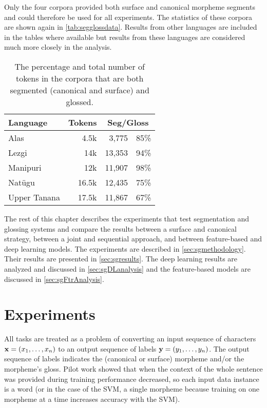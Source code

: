 Only the four corpora provided both surface and canonical morpheme segments and could therefore be used for all experiments. The statistics of these corpora are shown again in \autoref{tab:segglossdata}. Results from other languages are included in the tables where available but results from these languages are considered much more closely in the analysis. 

\begin{table}[!tb]
    \centering
    \begin{tabular}{l|r|rc}
         \textbf{Language} & \textbf{Tokens} & \multicolumn{2}{c}{\textbf{Seg/Gloss}} \\
         \hline
         Alas & 4.5k & 3,775 & 85\%  \\
         \hline
         Lezgi & 14k & 13,353  & 94\% \\
         \hline
         Manipuri & 12k & 11,907 & 98\% \\
         \hline
         Natügu & 16.5k & 12,435 & 75\%  \\
         \hline
         Upper Tanana & 17.5k & 11,867 & 67\% 
    \end{tabular}
    \caption[Data for Segmentation and Glossing Experimentation]{The percentage and total number of tokens in the corpora that are both segmented (canonical and surface) and glossed.}
    \label{tab:segglossdata}
\end{table}

The rest of this chapter describes the experiments that test segmentation and glossing systems and compare the results between a surface and canonical strategy, between a joint and sequential approach, and between feature-based and deep learning models. The experiments are described in \autoref{sec:sgmethodology}. Their results are presented in \autoref{sec:sgresults}. The deep learning results are analyzed and discussed in \autoref{sec:sgDLanalysis} and the feature-based models are discussed in \autoref{sec:sgFtrAnalysis}. 


\section{Experiments}
\label{sec:sgmethodology}

All tasks are treated as a problem of converting an input sequence of characters $\mathbf{x} = (x_1, \ldots, x_n)$ to an output sequence of labels $\mathbf{y} = (y_1, \ldots, y_n)$. The output sequence of labels indicates the (canonical or surface) morpheme and/or the morpheme's gloss. Pilot work showed that when the context of the whole sentence was provided during training performance decreased, so each input data instance is a word (or in the case of the SVM, a single morpheme because training on one morpheme at a time increases accuracy with the SVM). 

